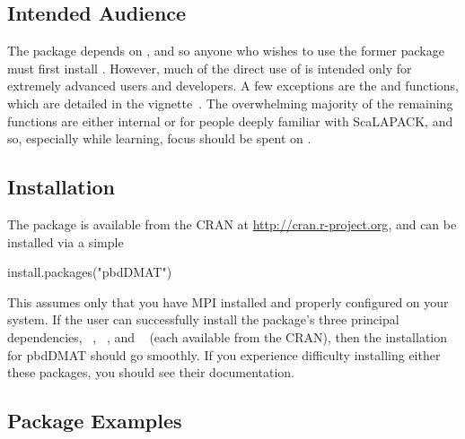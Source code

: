 \subsection{Intended Audience}
\label{sec:more_examples}

The  package depends on , and so anyone who wishes to use the former package must first install .  However, much of the direct use of  is intended only for extremely advanced users and developers.  A few exceptions are the  and  functions, which are detailed in the  vignette~\citep{Schmidt2012pbdBASEvignette}.  The overwhelming majority of the remaining functions are either internal or for people deeply familiar with ScaLAPACK, and so, especially while learning, focus should be spent on .






\subsection{Installation}
\label{sec:installation}

The  package is available from the CRAN at
\url{http://cran.r-project.org}, and can be installed via a simple 
\begin{Code}
install.packages("pbdDMAT")
\end{Code}
This assumes only that you have MPI installed and properly configured on your system.  If the user can successfully install the package's three principal dependencies, ~\citep{Chen2012pbdMPIpackage}, ~\citep{Chen2012pbdSLAPpackage}, and ~\citep{Schmidt2012pbdBASEpackage} (each available from the CRAN), then the installation for pbdDMAT should go smoothly.  If you experience difficulty installing either these packages, you should see their documentation.






\subsection{Package Examples}
\label{sec:more_examples}

